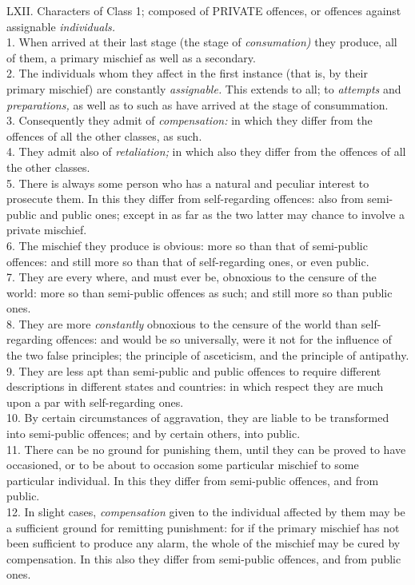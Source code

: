 \documentclass[12pt]{report}
\begin{document}
LXII. Characters of Class 1; composed of PRIVATE offences, or offences
against assignable \emph{individuals.}\\
1. When arrived at their last stage (the stage of \emph{consumation)}
they produce, all of them, a primary mischief as well as a secondary.\\
2. The individuals whom they affect in the first instance (that is, by
their primary mischief) are constantly \emph{assignable.} This extends
to all; to \emph{attempts} and \emph{preparations,} as well as to such
as have arrived at the stage of consummation.\\
3. Consequently they admit of \emph{compensation:} in which they differ
from the offences of all the other classes, as such.\\
4. They admit also of \emph{retaliation;} in which also they differ from
the offences of all the other classes.\\
5. There is always some person who has a natural and peculiar interest
to prosecute them. In this they differ from self-regarding offences:
also from semi-public and public ones; except in as far as the two
latter may chance to involve a private mischief.\\
6. The mischief they produce is obvious: more so than that of
semi-public offences: and still more so than that of self-regarding
ones, or even public.\\
7. They are every where, and must ever be, obnoxious to the censure of
the world: more so than semi-public offences as such; and still more so
than public ones.\\
8. They are more \emph{constantly} obnoxious to the censure of the world
than self-regarding offences: and would be so universally, were it not
for the influence of the two false principles; the principle of
asceticism, and the principle of antipathy.\\
9. They are less apt than semi-public and public offences to require
different descriptions in different states and countries: in which
respect they are much upon a par with self-regarding ones.\\
10. By certain circumstances of aggravation, they are liable to be
transformed into semi-public offences; and by certain others, into
public.\\
11. There can be no ground for punishing them, until they can be proved
to have occasioned, or to be about to occasion some particular mischief
to some particular individual. In this they differ from semi-public
offences, and from public.\\
12. In slight cases, \emph{compensation} given to the individual
affected by them may be a sufficient ground for remitting punishment:
for if the primary mischief has not been sufficient to produce any
alarm, the whole of the mischief may be cured by compensation. In this
also they differ from semi-public offences, and from public ones.
\end{document}
